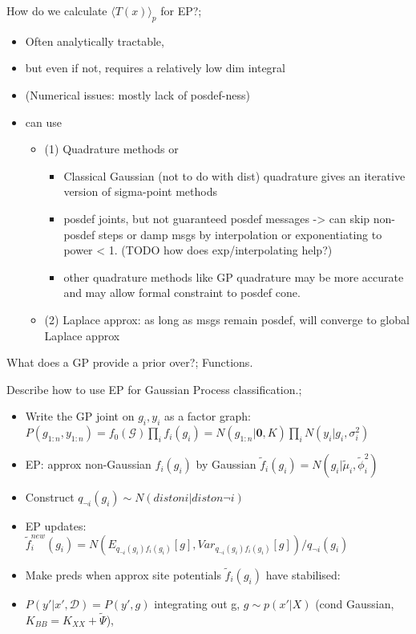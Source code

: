\documentclass{article}
\begin{document}
How do we calculate $\langle T(x) \rangle_p$ for EP?; \begin{itemize} \item Often analytically tractable,  \item but even if not, requires a relatively low dim integral  \item (Numerical issues: mostly lack of posdef-ness) \item can use \begin{itemize} \item (1) Quadrature methods or  \begin{itemize} \item Classical Gaussian (not to do with dist) quadrature gives an iterative version of sigma-point methods \item posdef joints, but not guaranteed posdef messages -> can skip non-posdef steps or damp msgs by interpolation or exponentiating to power < 1. (TODO how does exp/interpolating help?) \item other quadrature methods like GP quadrature may be more accurate and  may allow formal constraint to posdef cone. \end{itemize} \item (2) Laplace approx: as long as msgs remain posdef, will converge to global Laplace approx \end{itemize} \end{itemize}

What does a GP provide a prior over?; Functions.

Describe how to use EP for Gaussian Process classification.; \begin{itemize} \item Write the GP joint on $g_i, y_i$ as a factor graph: $P(g_{1:n}, y_{1:n}) = f_0(\mathcal{G})\prod_i f_i(g_i) = N(g_{1:n}|\mathbf{0}, K) \prod_i N(y_i|g_i, \sigma^2_i)$ \item EP: approx non-Gaussian $f_i(g_i)$ by Gaussian $\tilde{f}_i(g_i) = N(g_i | \tilde{\mu}_i, \tilde{\phi}^2_i)$ \item Construct $q_{\neg i}(g_i) \sim N(dist on i | dist on \neg i)$ \item EP updates: $\tilde{f}_i^{new}(g_i) = N(E_{q_{\neg i}(g_i)f_i(g_i)}[g], Var_{q_{\neg i}(g_i)f_i(g_i)}[g])/q_{\neg i}(g_i)$ \item Make preds when approx site potentials $\tilde{f}_i(g_i)$ have stabilised:  \item $P(y'|x', \mathcal{D}) = P(y', g)$ integrating out g, $g\sim p(x'|X)$ (cond Gaussian, $K_{BB} = K_{XX} + \tilde{\Psi}$),   \end{itemize}
\end{document}
